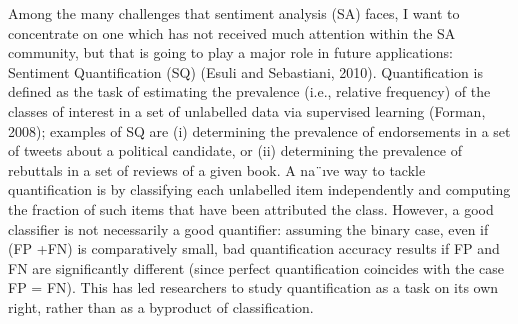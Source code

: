 Among the many challenges that sentiment analysis (SA) faces, I want to concentrate on one which has not received much attention within the SA community, but that is going to play a major role in future applications: Sentiment Quantification (SQ) (Esuli and Sebastiani, 2010). Quantification is defined as the task of estimating the prevalence (i.e., relative frequency) of the classes of interest in a set of unlabelled data via supervised learning (Forman, 2008); examples of SQ are (i) determining the prevalence of endorsements in a set of tweets about a political candidate, or (ii) determining the prevalence of rebuttals in a set of reviews of a given book. A na¨ıve way to tackle quantification is by classifying each unlabelled item independently and computing the fraction of such items that have been attributed the class. However, a good classifier is not necessarily a good quantifier: assuming the binary case, even if (FP +FN) is comparatively small, bad quantification accuracy results if FP and FN are significantly different (since perfect quantification coincides with the case FP = FN). This has led researchers to study quantification as a task on its own right, rather than as a byproduct of classification.
